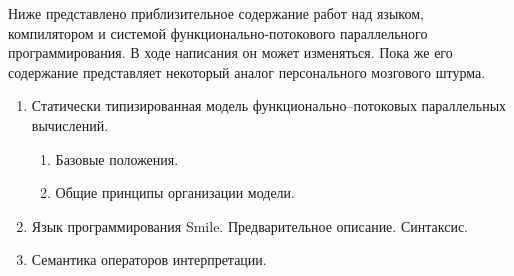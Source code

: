 Ниже представлено приблизительное содержание работ над языком, компилятором и системой функционально-потокового параллельного программирования. В ходе написания он может изменяться. Пока же его содержание представляет некоторый аналог персонального мозгового штурма.

\begin{enumerate}
	 \item  Статически типизированная модель функционально--потоковых параллельных вычислений.
 	\begin{enumerate}
   		\item Базовые положения.
   		\item Общие принципы организации модели.
  	\end{enumerate}
   	\item Язык программирования Smile. Предварительное описание. Синтаксис.
	\item Семантика операторов интерпретации.
\end{enumerate}

